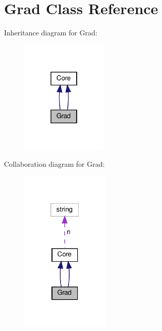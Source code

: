 \hypertarget{classGrad}{}\section{Grad Class Reference}
\label{classGrad}


Inheritance diagram for Grad\+:\nopagebreak
\begin{figure}[H]
\begin{center}
\leavevmode
\includegraphics[width=118pt]{classGrad__inherit__graph}
\end{center}
\end{figure}


Collaboration diagram for Grad\+:\nopagebreak
\begin{figure}[H]
\begin{center}
\leavevmode
\includegraphics[width=121pt]{classGrad__coll__graph}
\end{center}
\end{figure}
